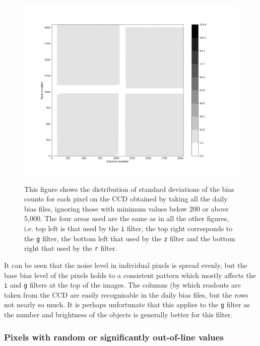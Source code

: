 \begin{figure}[!htbp]
\begin{center}
\includegraphics[scale=0.3]{images/std_allbiaslim250_5000.png}
\end{center}   
\caption{This figure shows the distribution of standard deviations of the
bias counts for each pixel on the CCD obtained by taking all the daily bias files, ignoring
those with minimum values below 200 or above 5,000. The four areas used are the
same as in all the other figures, i.e. top left is that used by the \texttt{i}
filter, the top right corresponds to the \texttt{g} filter, the bottom left
that used by the \texttt{z} filter and the bottom right that used by the
\texttt{r} filter.}
\protect\label{fig:std_allbiaslim250_5000}
\end{figure}
\clearpage

It can be seen that the noise level in individual pixels is spread evenly, but
the base bias level of the pixels holds to a consistent pattern which mostly
affects the \texttt{i} and \texttt{g} filters at the top of the images. The
columns (by which readouts are taken from the CCD are easily recognisable in the daily bias files, but the
rows not nearly so much. It is perhaps unfortunate that this applies to the
\texttt{g} filter as the number and brightness of the objects is generally
better for this filter.

\subsubsection{Pixels with random or significantly out-of-line values}
\protect\label{section:randpixels}

